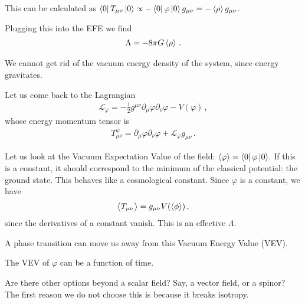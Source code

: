 \documentclass[main.tex]{subfiles}
\begin{document}
This can be calculated as \(\bra{0} T_{\mu \nu } \ket{0} \propto
 - \bra{0} \varphi \ket{0} g_{\mu \nu }= - \expval{\rho } g_{\mu \nu }\). 
 
Plugging this into the EFE we find 
%
\begin{align}
\Lambda = - 8 \pi G \expval{\rho }
\,.
\end{align}

We cannot get rid of the vacuum energy density of the system, since energy gravitates. 

Let us come back to the Lagrangian 
%
\begin{align}
\mathscr{L}_{\varphi } = - \frac{1}{2} g^{\mu \nu } \partial_{\mu } \varphi \partial_{\nu } \varphi - V(\varphi )
\,,
\end{align}
%
whose energy momentum tensor is 
%
\begin{align}
T^{\varphi }_{\mu \nu } = \partial_{\mu } \varphi \partial_{\nu } \varphi + \mathscr{L}_{\varphi } g_{\mu \nu }
\,.
\end{align}

Let us look at the Vacuum Expectation Value of the field: \(\expval{\varphi } = \bra{0} \varphi \ket{0}\). If this is a constant, it should correspond to the minimum of the classical potential: the ground state. 
This behaves like a cosmological constant. 
Since \(\varphi \) is a constant, we have 
%
\begin{align}
\expval{T_{\mu \nu }} = g_{\mu \nu } V(\expval{\phi })
\,,
\end{align}
%
since the derivatives of a constant vanish. 
This is an effective \(\Lambda \). 

A phase transition can move us away from this Vacuum Energy Value (VEV).

The VEV of \(\varphi \) can be a function of time. 

Are there other options beyond a scalar field? Say, a vector field, or a spinor?
The first reason we do not choose this is because it breaks isotropy.
\end{document}
